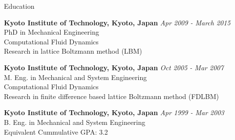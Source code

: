 \documentclass{resume} %
\begin{document}

\begin{rSection}{Education}

{\bf Kyoto Institute of Technology, Kyoto, Japan} \hfill {\em Apr 2009 - March 2015} \\ 
PhD in Mechanical Engineering \\
Computational Fluid Dynamics \\
Research in lattice Boltzmann method (LBM) 

{\bf Kyoto Institute of Technology, Kyoto, Japan} \hfill {\em Oct 2005 - Mar 2007} \\ 
M. Eng. in Mechanical and System Engineering \\
Computational Fluid Dynamics \\
Research in finite difference based lattice Boltzmann method (FDLBM)

{\bf Kyoto Institute of Technology, Kyoto, Japan} \hfill {\em Apr 1999 - Mar 2003} \\ 
B. Eng. in Mechanical and System Engineering \\
Equivalent Cummulative GPA: 3.2

\end{rSection}

\end{document}
